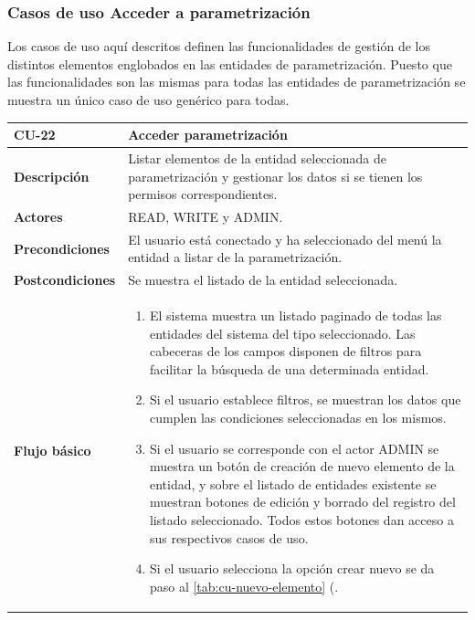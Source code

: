 \subsubsection{Casos de uso Acceder a parametrización} 
\label{sub:cu-parametrizacion}

Los casos de uso aquí descritos definen las funcionalidades de gestión de los distintos elementos englobados en las entidades de parametrización. Puesto que las funcionalidades son las mismas para todas las entidades de parametrización se muestra un único caso de uso genérico para todas. 

\begin{table} [H]
    \centering
    \setlength{\leftmargini}{0.4cm}
	\resizebox{14cm}{!} { %
    \begin{tabular}{| m{3cm} | m{11cm} |}   
    \hline
	  \textbf{CU-22} & \textbf{Acceder parametrización} \\\hline
	  \textbf{Descripción} & Listar elementos de la entidad seleccionada de parametrización y gestionar los datos si se tienen los permisos correspondientes. \\\hline
	  \textbf{Actores} & READ, WRITE y ADMIN. \\\hline
	  \textbf{Precondiciones} & El usuario está conectado y ha seleccionado del menú la entidad a listar de la parametrización. \\\hline
	  \textbf{Postcondiciones} & Se muestra el listado de la entidad seleccionada. \\\hline
	  \textbf{Flujo básico} & 
		\begin{enumerate}
	  	\item El sistema muestra un listado paginado de todas las entidades del sistema del tipo seleccionado. Las
cabeceras de los campos disponen de filtros para facilitar la búsqueda de una determinada entidad.
		\item Si el usuario establece filtros, se muestran los datos que cumplen las condiciones seleccionadas en los mismos.
		\item Si el usuario se corresponde con el actor ADMIN se muestra un botón de creación de nuevo elemento de la entidad, y sobre el listado de entidades existente se muestran botones de edición y borrado del registro del listado seleccionado. Todos estos botones dan acceso a sus respectivos casos de uso.
		\item Si el usuario selecciona la opción crear nuevo se da paso al \ref{tab:cu-nuevo-elemento} (\pageref{tab:cu-nuevo-elemento}.

\end{enumerate}
\end{tabular}}
\end{table}
